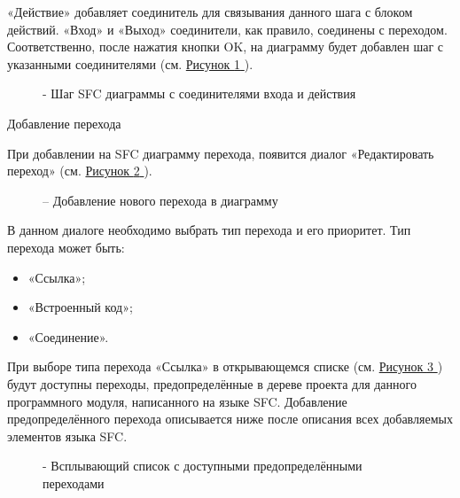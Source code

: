 \documentclass[letterpaper,10pt,russian]{sphinxmanual}
\begin{document}
«Действие» добавляет соединитель для связывания данного шага с блоком
действий. «Вход» и «Выход» соединители, как правило, соединены с
переходом. Соответственно, после нажатия кнопки OK, на диаграмму будет
добавлен шаг с указанными соединителями (см. \hyperref[usage_guide/ide_components:image93]{Рисунок \ref{usage_guide/ide_components:image93} }).
\begin{figure}[htbp]
\centering
\capstart

\noindent{}
\caption{- Шаг SFC диаграммы с соединителями входа и действия}\label{usage_guide/ide_components:image93}\end{figure}

Добавление перехода

При добавлении на SFC диаграмму перехода, появится диалог «Редактировать
переход» (см. \hyperref[usage_guide/ide_components:image94]{Рисунок \ref{usage_guide/ide_components:image94} }).
\begin{figure}[htbp]
\centering
\capstart

\noindent{}
\caption{– Добавление нового перехода в диаграмму}\label{usage_guide/ide_components:image94}\end{figure}

В данном диалоге необходимо выбрать тип перехода и его приоритет. Тип
перехода может быть:
\begin{itemize}
\item {} 
«Ссылка»;

\item {} 
«Встроенный код»;

\item {} 
«Соединение».

\end{itemize}

При выборе типа перехода «Ссылка» в открывающемся списке (см. \hyperref[usage_guide/ide_components:image95]{Рисунок \ref{usage_guide/ide_components:image95} })
будут доступны переходы, предопределённые в дереве проекта для данного
программного модуля, написанного на языке SFC. Добавление
предопределённого перехода описывается ниже после описания всех
добавляемых элементов языка SFC.
\begin{figure}[htbp]
\centering
\capstart

\noindent{}
\caption{- Всплывающий список с доступными предопределёнными переходами}\label{usage_guide/ide_components:image95}\end{figure}
\end{document}
